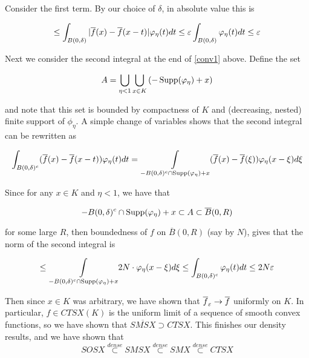 \documentclass[11pt,reqno]{amsart}
\numberwithin{equation}{section}
\newcommand{\lft}{\left(}
\newcommand{\rt}{\right)}
\newcommand{\ov}{\overline}
\begin{document}
Consider the first term. By our choice of $\delta$, in absolute value this is 

\begin{equation} \label{conv-bound-1}
\leq \int_{B(0,\delta)} |\ov{f}(x) - \ov{f}(x -t)| \phi_{\eta}(t) dt  \leq \eps \int_{B(0,\delta)} \phi_{\eta}(t) dt \leq \eps
\end{equation}

Next we consider the second integral at the end of \eqref{conv1} above. Define the set 

\begin{equation} \label{set-def}
A = \bigcup_{\eta < 1} \bigcup_{x \in K} \lft -\supp(\phi_{\eta}) + x \rt 
\end{equation}

and note that this set is bounded by compactness of $K$ and (decreasing, nested) finite support of $\phi_{\eta}$. A simple change of variables shows that the second integral can be rewritten as 

\begin{equation} \label{conv4 }
\int_{B(0, \delta)^c } (\ov{f}(x) - \ov{f}(x -t)) \phi_{\eta}(t) dt = \underset{- B(0, \delta)^c \cap \supp(\phi_{\eta}) + x}{\int} (\ov{f}(x) - \ov{f}(\xi)) \phi_{\eta}(x - \xi) d \xi 
\end{equation}

Since for any $x \in K$ and $\eta < 1$, we have that

\begin{equation} \label{conv5} 
- B(0, \delta)^c \cap \supp(\phi_{\eta}) + x \subset A \subset \ov{B}(0,R)
\end{equation}

for some large $R$, then boundedness of $f$ on $\ov{B}(0,R)$ (say by $N$), gives that the norm of the second integral is 

\begin{equation} \label{conv6}
\leq \underset{- B(0, \delta)^c \cap \operatorname{Supp}(\varphi_{\eta}) + x}{\int} 2N \cdot \varphi_{\eta}(x - \xi) d \xi \leq \int_{B(0, \delta)^c } \varphi_{\eta}(t) dt \leq 2N \varepsilon 
\end{equation}

Then since $x \in K$ was arbitrary, we have shown that $\ov{f}_{\eps} \to \ov{f}$ uniformly on $K$. In particular, $f \in CTSX(K)$ is the uniform limit of a sequence of smooth convex functions, so we have shown that $\ov{SMSX} \supset CTSX$. This finishes our density results, and we have shown that \\

\begin{equation} \label{dense-summ}
SOSX \overset{dense}{\subset} SMSX \overset{dense}{\subset} SMX \overset{dense}{\subset} CTSX 
\end{equation}
\end{document}

